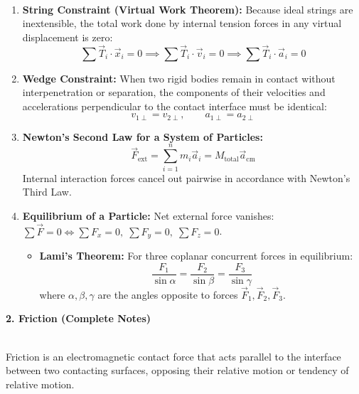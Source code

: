 \documentclass[11pt,a4paper]{article}
\begin{document}
\vspace{5pt}
\noindent{\large\textbf{\textsf{\textcolor{primaryDark}{1.4 Constraint Relations \& System Dynamics}}}}\\[3pt]
\begin{enumerate}[label=(\roman*),leftmargin=14pt,itemsep=2.5pt]
  \item \textbf{String Constraint (Virtual Work Theorem):} Because ideal strings are inextensible, the total work done by internal tension forces in any virtual displacement is zero:
  \[
    \sum \vec{T}_i \cdot \vec{x}_i = 0 \implies \sum \vec{T}_i \cdot \vec{v}_i = 0 \implies \sum \vec{T}_i \cdot \vec{a}_i = 0
  \]
  \item \textbf{Wedge Constraint:} When two rigid bodies remain in contact without interpenetration or separation, the components of their velocities and accelerations perpendicular to the contact interface must be identical:
  \[
    v_{1\perp} = v_{2\perp}, \qquad a_{1\perp} = a_{2\perp}
  \]
  \item \textbf{Newton's Second Law for a System of Particles:}
  \[
    \vec{F}_{\text{ext}} = \sum_{i=1}^n m_i \vec{a}_i = M_{\text{total}} \vec{a}_{\text{cm}}
  \]
  Internal interaction forces cancel out pairwise in accordance with Newton's Third Law.
  \item \textbf{Equilibrium of a Particle:} Net external force vanishes: $\sum \vec{F} = 0 \iff \sum F_x = 0, \;\sum F_y = 0, \;\sum F_z = 0$.
  \begin{itemize}[leftmargin=12pt,itemsep=1pt]
    \item \textbf{Lami's Theorem:} For three coplanar concurrent forces in equilibrium:
    \[
      \frac{F_1}{\sin\alpha} = \frac{F_2}{\sin\beta} = \frac{F_3}{\sin\gamma}
    \]
    where $\alpha, \beta, \gamma$ are the angles opposite to forces $\vec{F}_1, \vec{F}_2, \vec{F}_3$.
  \end{itemize}
\end{enumerate}

\vspace{10pt}

\begin{tcolorbox}[chapterbanner]
  {\Large \textbf{\textsf{2. Friction (Complete Notes)}}}
\end{tcolorbox}
\vspace{4pt}

\noindent{\large\textbf{\textsf{\textcolor{primaryDark}{2.1 Nature, Types and Governing Laws of Friction}}}}\\[3pt]
Friction is an electromagnetic contact force that acts parallel to the interface between two contacting surfaces, opposing their relative motion or tendency of relative motion.
\end{document}
